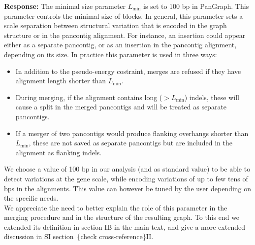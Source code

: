 \documentclass[aps,rmp,onecolumn]{revtex4-1}
\newcommand{\Lthr}{L_{\min}}
\newcommand{\response}[1]{{\it {\color{response}\textbf{Response:} #1}}\vskip 5mm}
\newcommand{\crossref}[1]{{\color{purple}\{check cross-reference\}#1}} %
\begin{document}
\response{The minimal size parameter $\Lthr$ is set to 100 bp in PanGraph. This parameter controls the minimal size of blocks. In general, this parameter sets a scale separation between structural variation that is encoded in the graph structure or in the pancontig alignment. For instance, an insertion could appear either as a separate pancontig, or as an insertion in the pancontig alignment, depending on its size. In practice this parameter is used in three ways:
      \begin{itemize}
            \item In addition to the pseudo-energy costraint, merges are refused if they have alignment length shorter than $\Lthr$.
            \item During merging, if the alignment contains long ($> \Lthr$) indels, these will cause a split in the merged pancontigs and will be treated as separate pancontigs.
            \item If a merger of two pancontigs would produce flanking overhangs shorter than $\Lthr$, these are not saved as separate pancontigs but are included in the alignment as flanking indels.
      \end{itemize}
      We choose a value of 100 bp in our analysis (and as standard value) to be able to detect variations at the gene scale, while encoding variations of up to few tens of bps in the alignments. This value can however be tuned by the user depending on the specific needs.\\
      We appreciate the need to better explain the role of this parameter in the merging procedure and in the structure of the resulting graph. To this end we extended its definition in section IB in the main text, and give a more extended discussion in SI section~\crossref{II}.\\
}
\end{document}
